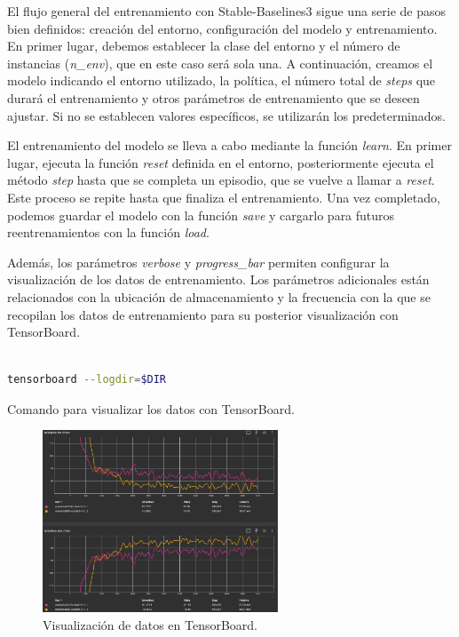 El flujo general del entrenamiento con Stable-Baselines3 sigue una serie de pasos bien definidos: creación del entorno, configuración del modelo y entrenamiento. En primer lugar, debemos establecer la clase del entorno y el número de instancias (\textit{n\_env}), que en este caso será sola una. A continuación, creamos el modelo indicando el entorno utilizado, la política, el número total de \textit{steps} que durará el entrenamiento y otros parámetros de entrenamiento que se deseen ajustar. Si no se establecen valores específicos, se utilizarán los predeterminados.

El entrenamiento del modelo se lleva a cabo mediante la función \textit{learn}. En primer lugar, ejecuta la función \textit{reset} definida en el entorno, posteriormente ejecuta el método \textit{step} hasta que se completa un episodio, que se vuelve a llamar a \textit{reset}. Este proceso se repite hasta que finaliza el entrenamiento. Una vez completado, podemos guardar el modelo con la función \textit{save} y cargarlo para futuros reentrenamientos con la función \textit{load}.

Además, los parámetros \textit{verbose} y \textit{progress\_bar} permiten configurar la visualización de los datos de entrenamiento. Los parámetros adicionales están relacionados con la ubicación de almacenamiento y la frecuencia con la que se recopilan los datos de entrenamiento para su posterior visualización con TensorBoard.

\begin{code}[h]
\begin{lstlisting}[language=bash]

tensorboard --logdir=$DIR

\end{lstlisting}
\caption[Comando para visualizar los datos en TensorBoard]{Comando para visualizar los datos con TensorBoard.}
\label{cod:cmdtsb}
\end{code}

\begin{figure}[ht]
  \begin{center}
    \includegraphics[width=7cm]{figs/Plataformas_Desarollo/TensorBoard.png}
  \end{center}
  \caption{Visualización de datos en TensorBoard.}
  \label{tensorboard}
\end{figure}


